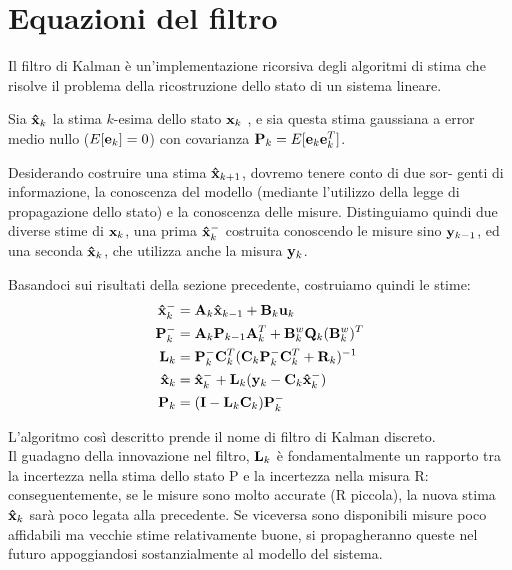 \section{Equazioni del filtro}

Il filtro di Kalman è un'implementazione ricorsiva degli algoritmi di stima che risolve il problema della ricostruzione dello stato di un sistema lineare.

Sia $\mathbf{\hat{x}}_k$ la stima $k$-esima dello stato $\mathbf{x}_k$ , e sia questa stima gaussiana a error medio nullo ($E[\mathbf{e}_k] = 0$) con covarianza $\mathbf{P}_k=E[\mathbf{e}_k\mathbf{e}_k^T]$.

Desiderando costruire una stima $\mathbf{\hat{x}}_{k+1}$, dovremo tenere conto di due sor-
genti di informazione, la conoscenza del modello (mediante l’utilizzo della
legge di propagazione dello stato) e la conoscenza delle misure. Distinguiamo
quindi due diverse stime di $\mathbf{x}_k$, una prima $\mathbf{\hat{x}}_k^-$ costruita conoscendo le misure sino $\mathbf{y}_{k-1}$, ed una seconda $\mathbf{\hat{x}}_k$, che utilizza anche la misura $\mathbf{y}_{k}$.

Basandoci sui risultati della sezione precedente, costruiamo quindi le stime:
\begin{align}
\mathbf{\hat{x}}_k^- &= \mathbf{A}_k\mathbf{\hat{x}}_{k-1} + \mathbf{B}_k\mathbf{u}_k \\
\mathbf{P}_k^- &= \mathbf{A}_k\mathbf{P}_{k-1}\mathbf{A}_k^T + \mathbf{B}^w_k\mathbf{Q}_k(\mathbf{B}^w_k)^T \\
\mathbf{L}_k &= \mathbf{P}_k^-\mathbf{C}_k^T(\mathbf{C}_k\mathbf{P}_k^-\mathbf{C}_k^T + \mathbf{R}_k)^{-1}\\
\mathbf{\hat{x}}_k &= \mathbf{\hat{x}}_k^- + \mathbf{L}_k(\mathbf{y}_k - \mathbf{C}_k\mathbf{\hat{x}}_k^-)\\
\mathbf{P}_k &= (\mathbf{I} - \mathbf{L}_k\mathbf{C}_k)\mathbf{P}_k^-
\end{align}

L’algoritmo così descritto prende il nome di filtro di Kalman discreto. \\ Il guadagno della innovazione nel filtro, $\mathbf{L}_k$ è fondamentalmente un rapporto tra la incertezza nella stima dello stato P e la incertezza nella misura R: conseguentemente, se le misure sono molto accurate (R piccola), la nuova stima $\mathbf{\hat{x}}_k$ sarà poco legata alla precedente. Se viceversa sono disponibili misure poco affidabili ma vecchie stime relativamente buone, si propagheranno queste nel futuro appoggiandosi sostanzialmente al modello del sistema.

\newpage